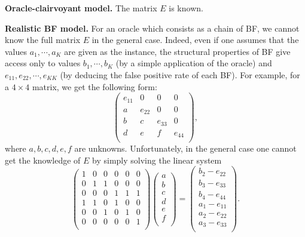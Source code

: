 \documentclass{article}
\begin{document}
\noindent\textbf{Oracle-clairvoyant model.} The matrix \(E\) is known.

\noindent\textbf{Realistic BF model.} For an oracle which consists as a chain of BF, we cannot know the full matrix
\(E\) in the general case. Indeed, even if one assumes that the values \(a_1,\cdots,a_K\) are given as the instance,
the structural properties of BF give access only to values \(b_1,\cdots,b_K\) (by a simple application of the oracle)
and \(e_{11},e_{22},\cdots,e_{KK}\) (by deducing the false positive rate of each BF). For example, for a
\(4\times 4\) matrix, we get the following form:
\[
    \begin{pmatrix}
        e_{11} & 0      & 0      & 0      \\
        a      & e_{22} & 0      & 0      \\
        b      & c      & e_{33} & 0      \\
        d      & e      & f      & e_{44} \\
    \end{pmatrix},
\]
where \(a,b,c,d,e,f\) are unknowns. Unfortunately, in the general case one cannot get the knowledge of \(E\) by simply
solving the linear system
\[
    \begin{pmatrix}
        1 & 0 & 0 & 0 & 0 & 0 \\
        0 & 1 & 1 & 0 & 0 & 0 \\
        0 & 0 & 0 & 1 & 1 & 1 \\
        1 & 1 & 0 & 1 & 0 & 0 \\
        0 & 0 & 1 & 0 & 1 & 0 \\
        0 & 0 & 0 & 0 & 0 & 1 \\
    \end{pmatrix}
    \begin{pmatrix}
        a \\ b \\ c \\ d \\ e \\ f \\
    \end{pmatrix}
    =
    \begin{pmatrix}
        b_2-e_{22} \\
        b_3-e_{33} \\
        b_4-e_{44} \\
        a_1-e_{11} \\
        a_2-e_{22} \\
        a_3-e_{33} \\
    \end{pmatrix}.
\]
\end{document}
